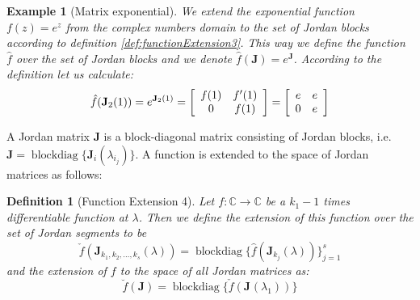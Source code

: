 \documentclass[a4paper,10pt,oneside]{book}
\newtheorem{example}{Example}
\newtheorem{definition}{Definition}
\begin{document}
\begin{example}[Matrix exponential]
 We extend the exponential function $f(z)=e^z$ from the complex numbers domain to the set of Jordan blocks
 according to definition \ref{def:functionExtension3}. This way we define the function $\hat{f}$ over the set
 of Jordan blocks and we denote $\hat{f}(\mathbf{J})=e^{\mathbf{J}}$. According to the definition let us calculate:
\begin{equation}
 \hat{f}(\mathbf{J}_2(1)) =  e^{\mathbf{J}_2(1)} = \left[ {\begin{array}{*{2}c}
 f(1) & f'(1) \\ 0 & f(1) 
 \end{array} } \right]=
\left[ {\begin{array}{*{2}c}
 e & e \\ 
 0 & e
 \end{array} } \right]
\end{equation}
\end{example}
\noindent A Jordan matrix $\mathbf{J}$ is a block-diagonal matrix consisting of Jordan blocks, i.e. $\mathbf{J}=\operatorname{block diag}\{\mathbf{J}_i(\lambda_{i_j})\}$. A function is extended to the space of Jordan matrices as follows:
 \begin{definition}[Function Extension 4]
 Let $f:\mathbb{C}\to\mathbb{C}$ be a $k_1-1$ times differentiable function at $\lambda$. Then we define the extension of this function over the set of Jordan segments to be 
 \begin{equation}	
  \check{f}(\mathbf{J}_{k_1,k_2,\ldots,k_s}(\lambda)) = \operatorname{block diag }\{\hat{f}(\mathbf{J}_{k_j}(\lambda))\}_{j=1}^s
 \end{equation}
 and the extension of $f$ to the space of all Jordan matrices as:
\begin{equation}
  \breve{f}(\mathbf{J}) = \operatorname{block diag }\{\check{f}(\mathbf{J}_{}(\lambda_1))\}
 \end{equation}
\end{definition}
\end{document}
